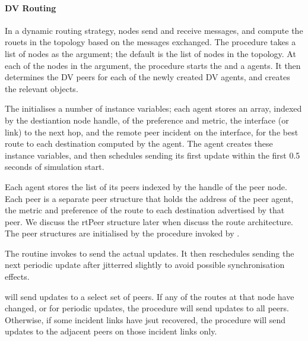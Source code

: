 \paragraph{DV Routing}
In a dynamic routing strategy, nodes send and receive messages,
and compute the rouets in the topology based on the messages exchanged.
The procedure
takes a list of nodes as the argument;
the default is the list of nodes in the topology.
At each of the nodes in the argument, the procedure starts the
 and a 
 agents.
It then determines the DV peers for each of the newly created DV agents,
and creates the relevant  objects.

The
initialises a number of instance variables;
each agent stores an array, indexed by the destiantion node handle,
of the preference and metric, the interface (or link) to the next hop,
and the remote peer incident on the interface,
for the best route to each destination computed by the agent.
The agent creates these instance variables, and then
schedules sending its first update within the first
0.5 seconds of simulation start.

Each agent stores the list of its peers indexed by the handle
of the peer node.
Each peer is a separate peer structure that holds
the address of the peer agent, the metric and preference
of the route to each destination advertised by that peer.
We discuss the rtPeer structure later
when discuss the route architecture.
The peer structures are initialised by the procedure
invoked by .

The routine 
invokes  to send the actual updates.
It then reschedules sending the next periodic update
after  jitterred slightly to avoid
possible synchronisation effects.

will send updates to a select set of peers.
If any of the routes at that node have changed, or for periodic updates,
the procedure will send updates to all peers.
Otherwise, if some incident links have jsut recovered,
the procedure will send updates to the adjacent peers on those incident
links only.

